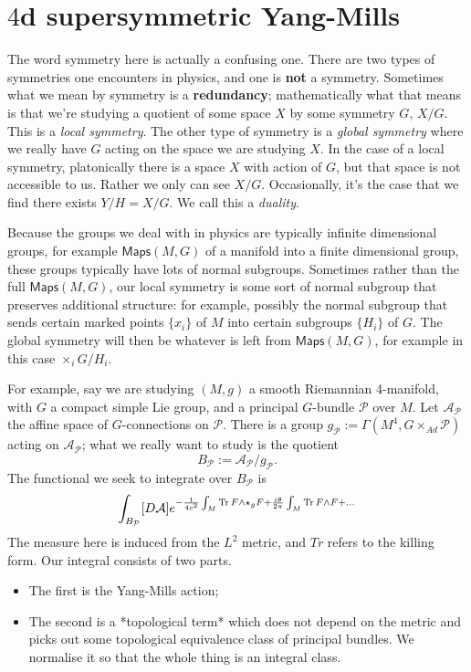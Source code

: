 \documentclass[leqno, openany]{memoir}
\theoremstyle{definition}
\theoremstyle{remark}
\theoremstyle{plain}
\theoremstyle{definition}
\theoremstyle{remark}
\newcommand{\ms}[1]{\mathsf{#1}}
\begin{document}
\section{$4$d supersymmetric Yang-Mills}

The word symmetry here is actually a confusing one. There are two types of symmetries one encounters in physics, and one is \textbf{not} a symmetry. Sometimes what we mean by symmetry is a \textbf{redundancy}; mathematically what that means is that we're studying a quotient of some space $X$ by some symmetry $G$, $X/G$. This is a \textit{local symmetry}. The other type of symmetry is a \textit{global symmetry} where we really have $G$ acting on the space we are studying $X$.
In the case of a local symmetry, platonically there is a space $X$ with action of $G$, but that space is not accessible to us. Rather we only can see $X/G$.
Occasionally, it's the case that we find there exists $Y/H = X/G$. We call this a \textit{duality}.

Because the groups we deal with in physics are typically infinite dimensional groups, for example $\ms{Maps}(M,G)$ of a manifold into a finite dimensional group, these groups typically have lots of normal subgroups.  Sometimes rather than the full $\ms{ Maps }(M,G)$, our local symmetry is some sort of normal subgroup that preserves additional structure: for example, possibly the normal subgroup that sends certain marked points $\{x_{i}\}$ of $M$ into certain subgroups $\{H_{i}\}$ of $G$.
The global symmetry will then be whatever is left from $\ms{Maps}(M,G)$, for example in this case $\times_{i} G/H_{i}$.

For example, say we are studying $(M,g)$ a smooth Riemannian 4-manifold, with $G$ a compact simple Lie group, and a principal $G$-bundle $\mathcal{P}$ over $M$. Let $\mathcal{A}_{\mathcal{P}}$ the affine space of $G$-connections on $\mathcal{P}$.  There is a group $g_{\mathcal{P}} := \Gamma(M^{4},G \times_{Ad} \mathcal{P})$ acting on $\mathcal{A}_{\mathcal{P}}$; what we really want to study is the quotient
\[
B_{\mathcal{P}} := \mathcal{A}_{\mathcal{P}}/g_{\mathcal{P}}.
\]
The functional we seek to integrate over $B_{\mathcal{P}}$ is
\[
\int_{B_{\mathcal{P}}} [D\mathcal{A}] e^{-\frac{1}{4c^{2}} \int_{M} \Tr F \wedge \star_{g} F +  \frac{i \theta}{2\pi} \int_{M} \Tr F \wedge F + \dots}
\]
The measure here is induced from the $L^{2}$ metric, and $Tr$ refers to the killing form. Our integral consists of two parts.

\begin{itemize}
  \item The first is the Yang-Mills action;
\item The second is a *topological term* which does not depend on the metric and picks out some topological equivalence class of principal bundles. We normalise it so that the whole thing is an integral class.
\end{itemize}
\end{document}
